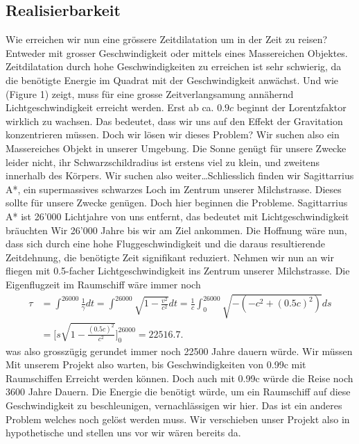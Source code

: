 \begin{refsection}
	\section{Realisierbarkeit}
	
	Wie erreichen wir nun eine grössere Zeitdilatation um in der Zeit zu reisen? Entweder mit grosser Geschwindigkeit oder mittels eines Massereichen Objektes. Zeitdilatation durch hohe Geschwindigkeiten zu erreichen ist sehr schwierig, da die benötigte Energie im Quadrat mit der Geschwindigkeit anwächst. Und wie (Figure 1) zeigt, muss für eine grosse Zeitverlangsamung annähernd Lichtgeschwindigkeit erreicht werden. Erst ab ca. $0.9c$ beginnt der Lorentzfaktor wirklich zu wachsen.
	Das bedeutet, dass wir uns auf den Effekt der Gravitation konzentrieren müssen.
	Doch wir lösen wir dieses Problem? Wir suchen also ein Massereiches Objekt in unserer Umgebung. Die Sonne genügt für unsere Zwecke leider nicht, ihr Schwarzschildradius ist erstens viel zu klein, und zweitens innerhalb des Körpers. Wir suchen also weiter\dots Schliesslich finden wir Sagittarrius A*, ein supermassives schwarzes Loch im Zentrum unserer Milchstrasse. Dieses sollte für unsere Zwecke genügen. 
	Doch hier beginnen die Probleme. 
	Sagittarrius A* ist 26'000 Lichtjahre von uns entfernt, das bedeutet mit Lichtgeschwindigkeit bräuchten Wir 26'000 Jahre bis wir am Ziel ankommen. Die Hoffnung wäre nun, dass sich durch eine hohe Fluggeschwindigkeit und die daraus resultierende Zeitdehnung, die benötigte Zeit signifikant reduziert. 
	Nehmen wir nun an wir fliegen mit 0.5-facher Lichtgeschwindigkeit ins Zentrum unserer Milchstrasse. Die Eigenflugzeit im Raumschiff wäre immer noch
	\begin{align*}
	\tau
	&= 
	\int_{}^{26000}\frac{1}{\gamma}dt=\int_{}^{26000}\sqrt{1-\frac{v^2}{c^2}}dt
	= 
	\frac{1}{c}\int_{0}^{26000}\sqrt{-(-c^2+(0.5c)^2)}ds\\
	&=
	\biggl[s\sqrt{1-\frac{(0.5c)^{2}}{c^2}}\biggr]_0^{26000}
	=
	22516.7.
	\end{align*}
	was also grosszügig gerundet immer noch 22500 Jahre dauern würde. 
	Wir müssen Mit unserem Projekt also warten, bis Geschwindigkeiten von 0.99c mit Raumschiffen Erreicht werden können. Doch auch mit 0.99c würde die Reise noch 3600 Jahre Dauern. Die Energie die benötigt würde, um ein Raumschiff auf diese Geschwindigkeit zu beschleunigen, vernachlässigen wir hier. Das ist ein anderes Problem welches noch gelöst werden muss.
	Wir verschieben unser Projekt also in hypothetische und stellen uns vor wir wären bereits da.
	

\end{refsection}
